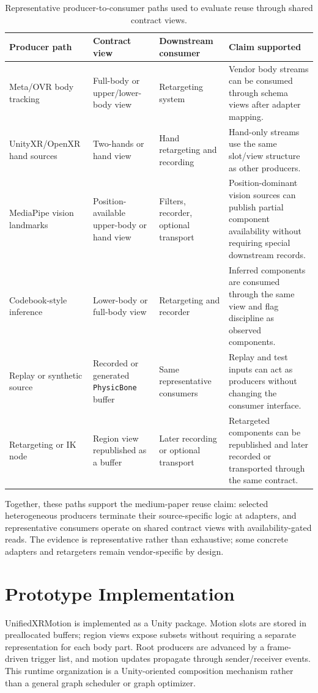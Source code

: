 \documentclass[runningheads]{llncs}
\begin{document}
\begin{table}[t]
\caption{Representative producer-to-consumer paths used to evaluate reuse through shared contract views.}\label{tab:producer-consumer}
\centering
\scriptsize
\begin{tabular}{@{}P{28mm}P{24mm}P{28mm}P{39mm}@{}}
\toprule
Producer path & Contract view & Downstream consumer & Claim supported \\
\midrule
Meta/OVR body tracking & Full-body or upper/lower-body view & Retargeting system & Vendor body streams can be consumed through schema views after adapter mapping. \\
UnityXR/OpenXR hand sources & Two-hands or hand view & Hand retargeting and recording & Hand-only streams use the same slot/view structure as other producers. \\
MediaPipe vision landmarks & Position-available upper-body or hand view & Filters, recorder, optional transport & Position-dominant vision sources can publish partial component availability without requiring special downstream records. \\
Codebook-style inference & Lower-body or full-body view & Retargeting and recorder & Inferred components are consumed through the same view and flag discipline as observed components. \\
Replay or synthetic source & Recorded or generated \texttt{PhysicBone} buffer & Same representative consumers & Replay and test inputs can act as producers without changing the consumer interface. \\
Retargeting or IK node & Region view republished as a buffer & Later recording or optional transport & Retargeted components can be republished and later recorded or transported through the same contract. \\
\bottomrule
\end{tabular}
\end{table}

Together, these paths support the medium-paper reuse claim: selected heterogeneous producers terminate their source-specific logic at adapters, and representative consumers operate on shared contract views with availability-gated reads. The evidence is representative rather than exhaustive; some concrete adapters and retargeters remain vendor-specific by design.

\section{Prototype Implementation}\label{sec:implementation}
UnifiedXRMotion is implemented as a Unity package. Motion slots are stored in preallocated buffers; region views expose subsets without requiring a separate representation for each body part. Root producers are advanced by a frame-driven trigger list, and motion updates propagate through sender/receiver events. This runtime organization is a Unity-oriented composition mechanism rather than a general graph scheduler or graph optimizer.
\end{document}
